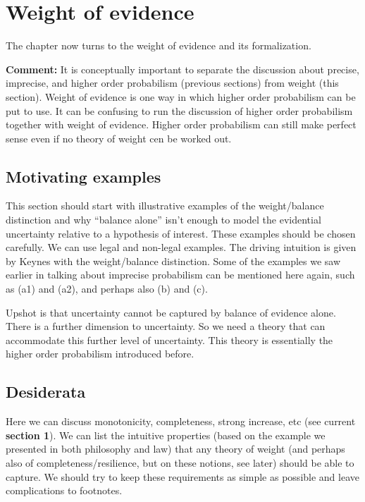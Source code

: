 \documentclass[
  10pt,
  dvipsnames,enabledeprecatedfontcommands]{scrartcl}
\begin{document}
\hypertarget{weight-of-evidence}{%
\section{Weight of evidence}\label{weight-of-evidence}}


The chapter now turns to the weight of evidence and its formalization.

\textbf{Comment:} It is conceptually important to separate the
discussion about precise, imprecise, and higher order probabilism
(previous sections) from weight (this section). Weight of evidence is
one way in which higher order probabilism can be put to use. It can be
confusing to run the discussion of higher order probabilism together
with weight of evidence. Higher order probabilism can still make perfect
sense even if no theory of weight cen be worked out.

\hypertarget{motivating-examples-1}{%
\subsection{Motivating examples}\label{motivating-examples-1}}

This section should start with illustrative examples of the
weight/balance distinction and why ``balance alone'' isn't enough to
model the evidential uncertainty relative to a hypothesis of interest.
These examples should be chosen carefully. We can use legal and
non-legal examples. The driving intuition is given by Keynes with the
weight/balance distinction. Some of the examples we saw earlier in
talking about imprecise probabilism can be mentioned here again, such as
(a1) and (a2), and perhaps also (b) and (c).

Upshot is that uncertainty cannot be captured by balance of evidence
alone. There is a further dimension to uncertainty. So we need a theory
that can accommodate this further level of uncertainty. This theory is
essentially the higher order probabilism introduced before.

\hypertarget{desiderata}{%
\subsection{Desiderata}\label{desiderata}}

Here we can discuss monotonicity, completeness, strong increase, etc
(see current \textbf{section 1}). We can list the intuitive properties
(based on the example we presented in both philosophy and law) that any
theory of weight (and perhaps also of completeness/resilience, but on
these notions, see later) should be able to capture. We should try to
keep these requirements as simple as possible and leave complications to
footnotes.
\end{document}
